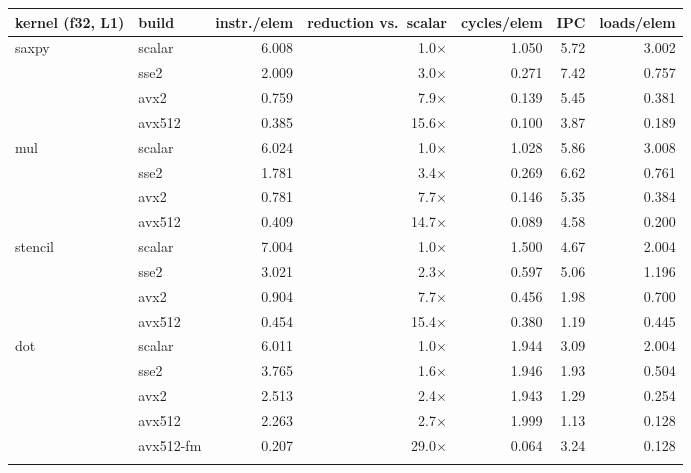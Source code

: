 \begin{tabular}{llrrrrr}
\toprule
kernel (f32, L1) & build & instr./elem & reduction vs.\ scalar & cycles/elem & IPC & loads/elem \\
\midrule
saxpy & scalar & 6.008 & 1.0$\times$ & 1.050 & 5.72 & 3.002 \\
 & sse2 & 2.009 & 3.0$\times$ & 0.271 & 7.42 & 0.757 \\
 & avx2 & 0.759 & 7.9$\times$ & 0.139 & 5.45 & 0.381 \\
 & avx512 & 0.385 & 15.6$\times$ & 0.100 & 3.87 & 0.189 \\
\addlinespace
mul & scalar & 6.024 & 1.0$\times$ & 1.028 & 5.86 & 3.008 \\
 & sse2 & 1.781 & 3.4$\times$ & 0.269 & 6.62 & 0.761 \\
 & avx2 & 0.781 & 7.7$\times$ & 0.146 & 5.35 & 0.384 \\
 & avx512 & 0.409 & 14.7$\times$ & 0.089 & 4.58 & 0.200 \\
\addlinespace
stencil & scalar & 7.004 & 1.0$\times$ & 1.500 & 4.67 & 2.004 \\
 & sse2 & 3.021 & 2.3$\times$ & 0.597 & 5.06 & 1.196 \\
 & avx2 & 0.904 & 7.7$\times$ & 0.456 & 1.98 & 0.700 \\
 & avx512 & 0.454 & 15.4$\times$ & 0.380 & 1.19 & 0.445 \\
\addlinespace
dot & scalar & 6.011 & 1.0$\times$ & 1.944 & 3.09 & 2.004 \\
 & sse2 & 3.765 & 1.6$\times$ & 1.946 & 1.93 & 0.504 \\
 & avx2 & 2.513 & 2.4$\times$ & 1.943 & 1.29 & 0.254 \\
 & avx512 & 2.263 & 2.7$\times$ & 1.999 & 1.13 & 0.128 \\
 & avx512-fm & 0.207 & 29.0$\times$ & 0.064 & 3.24 & 0.128 \\
\addlinespace
\bottomrule
\end{tabular}
